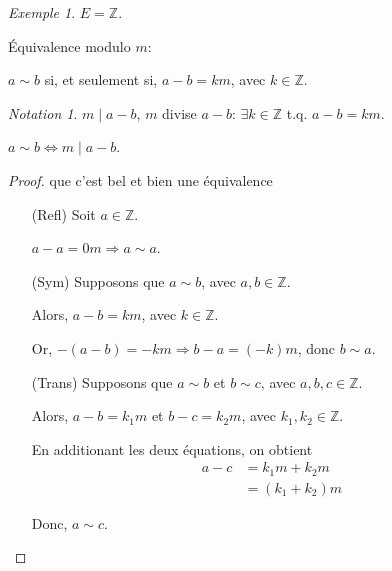 \documentclass{report}
\newcommand*{\entiers}{\mathbb{Z}}
\theoremstyle{definition}
\theoremstyle{remark}
\newtheorem*{exem}{Exemple}
\newtheorem*{nota}{Notation}
\begin{document}
	\begin{exem}
		$E=\entiers$.

		\'Equivalence modulo $m$:

		$a \sim b$ si, et seulement si, $a-b=km$, avec $k \in \entiers$.
		\begin{nota}
			$m \mid a-b$, $m$ divise $a-b$: $\exists k \in \entiers$ t.q. $a-b=km$.
		\end{nota}

		$a \sim b \Longleftrightarrow m \mid a-b$.
		\begin{proof}
			que c'est bel et bien une \'equivalence
			\begin{itemize}
				\item[(Refl)] Soit $a \in \entiers$.

				$a-a=0m \Rightarrow a \sim a$.
				\item[(Sym)] Supposons que $a \sim b$, avec $a,b \in \entiers$.

				Alors, $a-b=km$, avec $k \in \entiers$.

				Or, $-(a-b)=-km \Rightarrow b-a=(-k)m$, donc $b \sim a$.
				\item[(Trans)] Supposons que $a \sim b$ et $b \sim c$, avec $a,b,c \in \entiers$.

				Alors, $a-b=k_1m$ et $b-c=k_2m$, avec $k_1,k_2 \in \entiers$.

				En additionant les deux \'equations, on obtient
				\begin{align*}
					a-c&= k_1m+k_2m\\
					&= (k_1+k_2)m
				\end{align*}

				Donc, $a \sim c$.
			\end{itemize}
		\end{proof}


\end{exem}
\end{document}

